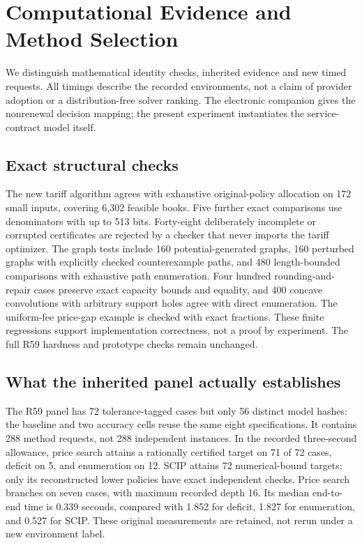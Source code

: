 \documentclass[11pt,letterpaper]{article}
\theoremstyle{definition}\newtheorem{remark}[theorem]{Remark}
\begin{document}
\section{Computational Evidence and Method Selection}\label{sec:study59}
We distinguish mathematical identity checks, inherited evidence and new timed requests. All timings describe the recorded environments, not a claim of provider adoption or a distribution-free solver ranking. The electronic companion gives the nonrenewal decision mapping; the present experiment instantiates the service-contract model itself.

\subsection{Exact structural checks}
The new tariff algorithm agrees with exhaustive original-policy allocation on 172 small inputs, covering 6,302 feasible books. Five further exact comparisons use denominators with up to 513 bits. Forty-eight deliberately incomplete or corrupted certificates are rejected by a checker that never imports the tariff optimizer. The graph tests include 160 potential-generated graphs, 160 perturbed graphs with explicitly checked counterexample paths, and 480 length-bounded comparisons with exhaustive path enumeration. Four hundred rounding-and-repair cases preserve exact capacity bounds and equality, and 400 concave convolutions with arbitrary support holes agree with direct enumeration. The uniform-fee price-gap example is checked with exact fractions. These finite regressions support implementation correctness, not a proof by experiment. The full R59 hardness and prototype checks remain unchanged.

\subsection{What the inherited panel actually establishes}
The R59 panel has 72 tolerance-tagged cases but only 56 distinct model hashes: the baseline and two accuracy cells reuse the same eight specifications. It contains 288 method requests, not 288 independent instances. In the recorded three-second allowance, price search attains a rationally certified target on 71 of 72 cases, deficit on 5, and enumeration on 12. SCIP attains 72 numerical-bound targets; only its reconstructed lower policies have exact independent checks. Price search branches on seven cases, with maximum recorded depth 16. Its median end-to-end time is 0.339 seconds, compared with 1.852 for deficit, 1.827 for enumeration, and 0.527 for SCIP. These original measurements are retained, not rerun under a new environment label.
\end{document}
